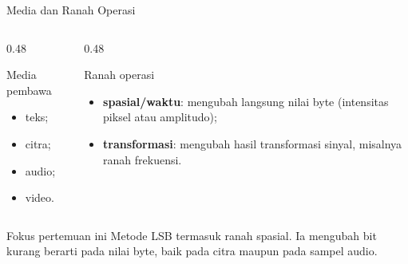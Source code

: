 \documentclass[aspectratio=169,11pt]{beamer}
\begin{document}
\begin{frame}{Media dan Ranah Operasi}
    \begin{columns}[T,onlytextwidth]
        \begin{column}{0.48\textwidth}
            \begin{block}{Media pembawa}
                \footnotesize
                \begin{itemize}
                    \item teks;
                    \item citra;
                    \item audio;
                    \item video.
                \end{itemize}
            \end{block}
        \end{column}
        \begin{column}{0.48\textwidth}
            \begin{block}{Ranah operasi}
                \footnotesize
                \begin{itemize}
                    \item \textbf{spasial/waktu}: mengubah langsung nilai byte
                          (intensitas piksel atau amplitudo);
                    \item \textbf{transformasi}: mengubah hasil transformasi
                          sinyal, misalnya ranah frekuensi.
                \end{itemize}
            \end{block}
        \end{column}
    \end{columns}
    \vspace{0.2cm}
    \begin{exampleblock}{Fokus pertemuan ini}
        \footnotesize
        Metode LSB termasuk ranah spasial. Ia mengubah bit kurang berarti pada
        nilai byte, baik pada citra maupun pada sampel audio.
    \end{exampleblock}
\end{frame}
\end{document}
